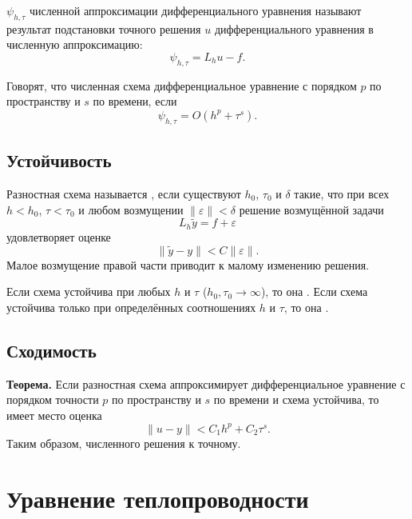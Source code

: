 \documentclass[../final.tex]{subfiles}
\begin{document}
 $\psi_{h,\tau}$ численной аппроксимации
дифференциального уравнения называют результат подстановки
точного решения $u$ дифференциального уравнения в численную
аппроксимацию:
\begin{equation*}
    \psi_{h,\tau}=L_hu-f.
\end{equation*}

Говорят, что численная схема  дифференциальное
уравнение с порядком $p$ по пространству и $s$ по времени, если
\begin{equation*}
    \psi_{h,\tau}=O(h^p+\tau^s).
\end{equation*}

\subsection{Устойчивость}

Разностная схема называется , если существуют
$h_0$, $\tau_0$ и $\delta$ такие, что при всех $h<h_0$, $\tau<\tau_0$
и любом возмущении $\|\varepsilon\|<\delta$ решение возмущённой задачи
\begin{equation*}
    L_h\tilde y=f+\varepsilon
\end{equation*}
удовлетворяет оценке
\begin{equation*}
    \|\tilde y-y\|<C\|\varepsilon\|.
\end{equation*}
Малое возмущение правой части приводит к малому изменению решения.

Если схема устойчива при любых $h$ и $\tau$
($h_0,\tau_0\to\infty$), то она .
Если схема устойчива только при определённых соотношениях
$h$ и $\tau$, то она .

\subsection{Сходимость}

\textbf{Теорема.} Если разностная схема аппроксимирует дифференциальное
уравнение с порядком точности $p$ по пространству и $s$ по времени
и схема устойчива, то имеет место оценка
\begin{equation*}
    \|u-y\|<C_1h^p+C_2\tau^s.
\end{equation*}
Таким образом,  численного решения к точному.

\section{Уравнение теплопроводности}
\end{document}
